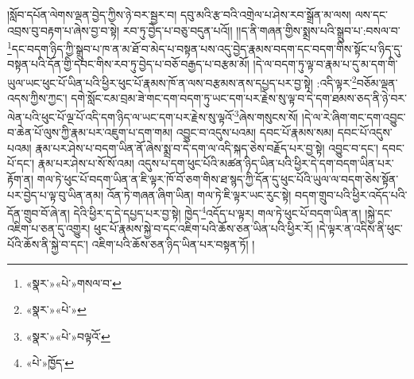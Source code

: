 །སློབ་དཔོན་ལེགས་ལྡན་བྱེད་ཀྱིས་ཉེ་བར་སྦྱར་བ། དབུ་མའི་རྩ་བའི་འགྲེལ་པ་ཤེས་རབ་སྒྲོན་མ་ལས། ལས་དང་འབྲས་བུ་བརྟག་པ་ཞེས་བྱ་བ་སྟེ། རབ་ཏུ་བྱེད་པ་བཅུ་བདུན་པའོ།། །།ད་ནི་གཞན་གྱིས་སྨྲས་པའི་སྒྲུབ་པ་:བསལ་བ་\footnote{«སྣར་»«པེ་»གསལ་བ་}དང་བདག་ཉིད་ཀྱི་སྒྲུབ་པ་ཁ་ན་མ་ཐོ་བ་མེད་པ་བསྟན་པས་འདུ་བྱེད་རྣམས་བདག་དང་བདག་གིས་སྟོང་པ་ཉིད་དུ་བསྟན་པའི་དོན་གྱི་དབང་གིས་རབ་ཏུ་བྱེད་པ་བཅོ་བརྒྱད་པ་བརྩམ་མོ། །དེ་ལ་བདག་ཏུ་ལྟ་བ་རྣམ་པ་དུ་མ་དག་གི་ཡུལ་ཡང་ཕུང་པོ་ཡིན་པའི་ཕྱིར་ཕུང་པོ་རྣམས་ཁོ་ན་ལས་བརྩམས་ནས་དཔྱད་པར་བྱ་སྟེ། :འདི་ལྟར་\footnote{«སྣར་»«པེ་»}བཅོམ་ལྡན་འདས་ཀྱིས་ཀྱང་། དགེ་སློང་ངམ་བྲམ་ཟེ་གང་དག་བདག་ཏུ་ཡང་དག་པར་རྗེས་སུ་ལྟ་བ་དེ་དག་ཐམས་ཅད་ནི་ཉེ་བར་ལེན་པའི་ཕུང་པོ་ལྔ་པོ་འདི་དག་ཉིད་ལ་ཡང་དག་པར་རྗེས་སུ་ལྟའོ་\footnote{«སྣར་»«པེ་»བལྟའོ་}ཞེས་གསུངས་སོ། །དེ་ལ་རེ་ཞིག་གང་དག་འབྱུང་བ་ཆེན་པོ་ལུས་ཀྱི་རྣམ་པར་འཇུག་པ་དག་གམ། འབྱུང་བ་འདུས་པའམ། དབང་པོ་རྣམས་སམ། དབང་པོ་འདུས་པའམ། རྣམ་པར་ཤེས་པ་བདག་ཡིན་ནོ་ཞེས་སྨྲ་བ་དེ་དག་ལ་འདི་སྐད་ཅེས་བརྗོད་པར་བྱ་སྟེ། འབྱུང་བ་དང་། དབང་པོ་དང་། རྣམ་པར་ཤེས་པ་སོ་སོ་འམ། འདུས་པ་དག་ཕུང་པོའི་མཚན་ཉིད་ཡིན་པའི་ཕྱིར་དེ་དག་བདག་ཡིན་པར་རྟོག་ན། གལ་ཏེ་ཕུང་པོ་བདག་ཡིན་ན་ཇི་ལྟར་ཁོ་བོ་ཅག་གིས་ཐ་སྙད་ཀྱི་དོན་དུ་ཕུང་པོའི་ཡུལ་ལ་བདག་ཅེས་སྟོན་པར་བྱེད་པ་ལྟ་བུ་ཡིན་ནམ། འོན་ཏེ་གཞན་ཞིག་ཡིན། གལ་ཏེ་ཇི་ལྟར་ཡང་རུང་སྟེ། བདག་གྲུབ་པའི་ཕྱིར་འདོད་པའི་དོན་གྲུབ་བོ་ཞེ་ན། དེའི་ཕྱིར་ད་དེ་དཔྱད་པར་བྱ་སྟེ། ཁྱེད་\footnote{«པེ་»ཁྱོད་}འདོད་པ་ལྟར། གལ་ཏེ་ཕུང་པོ་བདག་ཡིན་ན། །སྐྱེ་དང་འཇིག་པ་ཅན་དུ་འགྱུར། ཕུང་པོ་རྣམས་སྐྱེ་བ་དང་འཇིག་པའི་ཆོས་ཅན་ཡིན་པའི་ཕྱིར་རོ། །དེ་ལྟར་ན་འདིས་ནི་ཕུང་པོའི་ཆོས་ནི་སྐྱེ་བ་དང་། འཇིག་པའི་ཆོས་ཅན་ཉིད་ཡིན་པར་བསྟན་ཏོ། །
